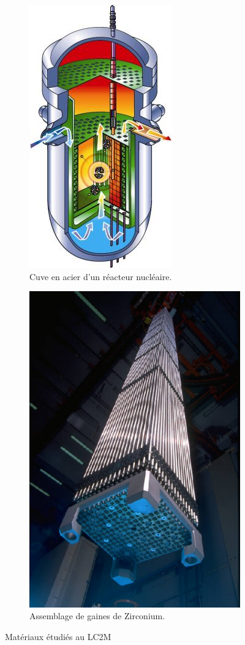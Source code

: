 \documentclass[11pt,class=article,float=false,crop=false]{standalone}
\begin{document}
\begin{figure}[H]
	\centering
	\begin{subfigure}[b]{0.49\textwidth}
		\centering
		\includegraphics[height=0.3\textheight]{img/cuve}
		\caption{Cuve en acier d'un réacteur nucléaire.}
		\label{fig:cuve}
	\end{subfigure}
	\begin{subfigure}[b]{0.49\textwidth}
		\centering
		\includegraphics[height=0.3\textheight]{img/fuel_assembly}
		\caption{Assemblage de gaines de Zirconium.}
		\label{fig:gaine_zr}
	\end{subfigure}
	\caption{Matériaux étudiés au LC2M}
\end{figure}
\end{document}
